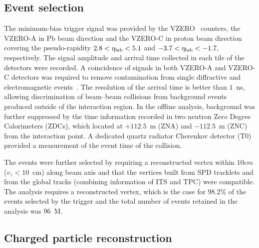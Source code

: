 

\subsection{Event selection}

The minimum-bias trigger signal was provided by the VZERO~\cite{Abbas:2013taa} counters, the VZERO-A in Pb beam direction and the VZERO-C in proton beam direction covering the pseudo-rapidity $2.8<\eta_{\rm lab}<5.1$ and $-3.7<\eta_{\rm lab}<-1.7$, respectively.
The signal amplitude and arrival time collected in each tile of the detectors were recorded. 
A coincidence of signals in both VZERO-A and VZERO-C detectors was required to remove contamination from single diffractive and electromagnetic events~\cite{ALICE:2012xs}. 
The resolution of the arrival time is better than $1$~ns, allowing discrimination of beam--beam collisions from background events produced outside of the interaction region.
In the offline analysis, background was further suppressed by the time information recorded in two neutron Zero Degree Calorimeters (ZDCs), which located at $+112.5$~m (ZNA) and $-112.5$~m (ZNC) from the interaction point.
A dedicated quartz radiator Cherenkov detector (T0)~\cite{Akindinov:2013tea} provided a measurement of the event time of the collision.


The events were further selected by requiring a reconstructed vertex within $10cm$ ($v_{z}<10$~cm) along beam axis and that the vertices built from SPD tracklets and from the global tracks (combining information of ITS and TPC) were compatible. 
The analysis requires a reconstructed vertex, which is the case for 98.2\% of the events selected by the trigger and the total number of events retained in the analysis was 96~M.

\subsection{Charged particle reconstruction}

